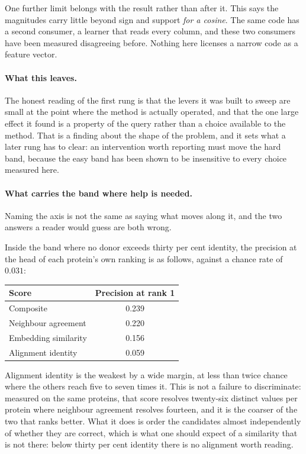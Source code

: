 One further limit belongs with the result rather than after it. This says
the magnitudes carry little beyond sign and support \emph{for a cosine}.
The same code has a second consumer, a learner that reads every column,
and these two consumers have been measured disagreeing before. Nothing
here licenses a narrow code as a feature vector.

\paragraph{What this leaves.}
The honest reading of the first rung is that the levers it was built to
sweep are small at the point where the method is actually operated, and
that the one large effect it found is a property of the query rather than
a choice available to the method. That is a finding about the shape of the
problem, and it sets what a later rung has to clear: an intervention worth
reporting must move the hard band, because the easy band has been shown to
be insensitive to every choice measured here.

\paragraph{What carries the band where help is needed.}
Naming the axis is not the same as saying what moves along it, and the two
answers a reader would guess are both wrong.

Inside the band where no donor exceeds thirty per cent identity, the
precision at the head of each protein's own ranking is as follows, against
a chance rate of $0.031$:

\begin{center}
\begin{tabular}{lc}
\toprule
Score & Precision at rank 1 \\
\midrule
Composite            & 0.239 \\
Neighbour agreement  & 0.220 \\
Embedding similarity & 0.156 \\
Alignment identity   & 0.059 \\
\bottomrule
\end{tabular}
\end{center}

Alignment identity is the weakest by a wide margin, at less than twice
chance where the others reach five to seven times it. This is not a failure
to discriminate: measured on the same proteins, that score resolves
twenty-six distinct values per protein where neighbour agreement resolves
fourteen, and it is the coarser of the two that ranks better. What it does
is order the candidates almost independently of whether they are correct,
which is what one should expect of a similarity that is not there: below
thirty per cent identity there is no alignment worth reading.

